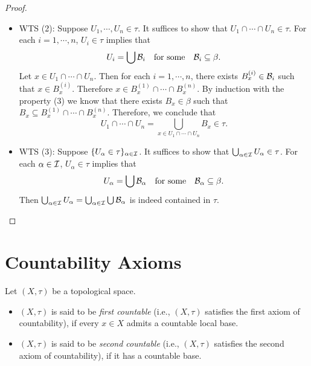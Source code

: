 \documentclass{techreport}
\begin{document}
\begin{proof}
\begin{itemize}
\begin{itemize}
			\item WTS (2):
			Suppose $U_1,\cdots,U_n \in \tau$.
			It suffices to show that $U_1 \cap \cdots \cap U_n \in \tau$.
			For each $i=1,\cdots,n$, $U_i \in \tau$ implies that
			\[
			U_i = \bigcup \mathcal{B}_i \quad \text{for some} \quad \mathcal{B}_i \subseteq \beta.
			\]
			Let $x \in U_1 \cap \cdots \cap U_n$.
			Then for each $i=1,\cdots,n$, there exists $B_x^{(i)} \in \mathcal{B}_i$ such that $x \in B_x^{(i)}$.
			Therefore $x \in B_x^{(1)} \cap \cdots \cap B_x^{(n)}$.
			By induction with the property (3) we know that there exists $B_x \in \beta$ such that $B_x \subseteq B_x^{(1)} \cap \cdots \cap B_x^{(n)}$.
			Therefore, we conclude that
			\[
			U_1 \cap \cdots \cap U_n = \bigcup_{x \in U_1 \cap \cdots \cap U_n} B_x \in \tau.
			\]
			
			\item WTS (3):
			Suppose $\{U_\alpha \in \tau\}_{\alpha \in \mathcal{I}}$.
			It suffices to show that $\bigcup_{\alpha \in \mathcal{I}} U_\alpha \in \tau$.
			For each $\alpha \in \mathcal{I}$, $U_\alpha \in \tau$ implies that
			\[
			U_\alpha = \bigcup \mathcal{B}_\alpha \quad \text{for some} \quad \mathcal{B}_\alpha \subseteq \beta.
			\]
			Then $\bigcup_{\alpha \in \mathcal{I}} U_\alpha = \bigcup_{\alpha \in \mathcal{I}} \bigcup \mathcal{B}_\alpha$ is indeed contained in $\tau$.
		\end{itemize}
	\end{itemize}
\end{proof}

\section{Countability Axioms}

\begin{definition}\label{De:AxiomsOfCountability}
	Let $(X,\tau)$ be a topological space.
	\begin{itemize}
		\item $(X,\tau)$ is said to be \emph{first countable} (i.e., $(X,\tau)$ satisfies the first axiom of countability), if every $x \in X$ admits a countable local base.
		\item $(X,\tau)$ is said to be \emph{second countable} (i.e., $(X,\tau)$ satisfies the second axiom of countability), if it has a countable base.
	\end{itemize}
\end{definition}
\end{document}
